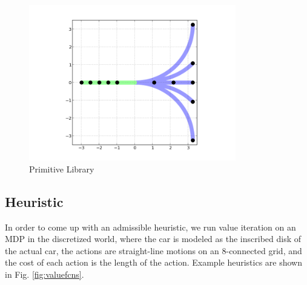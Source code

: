 \documentclass{article}
\begin{document}
\begin{figure}[ht]
\centering
\includegraphics[width=256pt,keepaspectratio]{figures/primitives.png}
\caption{Primitive Library}
\label{fig:prim_lib}
\end{figure}

\subsection{Heuristic}

In order to come up with an admissible heuristic, we run value iteration on an MDP in the discretized world, where the car is modeled as the inscribed disk of the actual car, the actions are straight-line motions on an 8-connected grid, and the cost of each action is the length of the action. Example heuristics are shown in Fig. \ref{fig:valuefcns}.
 
\end{document}
